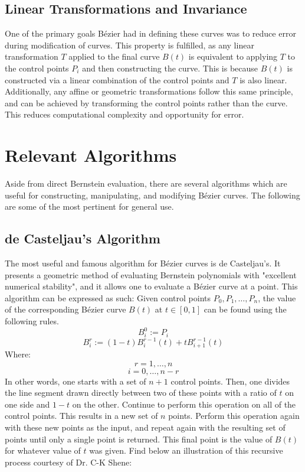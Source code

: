 \documentclass{article}
\begin{document}
\subsection{Linear Transformations and Invariance}
One of the primary goals Bézier had in defining these curves was to reduce error during modification of curves. This property is fulfilled, as any linear transformation $T$ applied to the final curve $B(t)$ is equivalent to applying $T$ to the control points $P_i$ and then constructing the curve. This is because $B(t)$ is constructed via a linear combination of the control points and $T$ is also linear.\cite{wyss-gallifent21} Additionally, any affine or geometric transformations follow this same principle, and can be achieved by transforming the control points rather than the curve.\cite{shene11} This reduces computational complexity and opportunity for error.

\pagebreak

\section{Relevant Algorithms}
Aside from direct Bernstein evaluation, there are several algorithms which are useful for constructing, manipulating, and modifying Bézier curves. The following are some of the most pertinent for general use.

\subsection{de Casteljau's Algorithm}
The most useful and famous algorithm for Bézier curves is de Casteljau's. It presents a geometric method of evaluating Bernstein polynomials with "excellent numerical stability"\cite{hanik-yazdani-tycoqicz24}, and it allows one to evaluate a Bézier curve at a point. This algorithm can be expressed as such:
Given control points $P_0, P_1, \dots, P_n$, the value of the corresponding Bézier curve $B(t)$ at $t\in[0,1]$ can be found using the following rules. $$B_i^0 := P_i$$$$B_i^r := (1-t)B_i^{r-1}(t)+tB_{i+1}^{r-1}(t)$$
Where:
$$r=1,\dots,n$$ $$i=0,\dots,n-r$$
\cite{hanik-yazdani-tycoqicz24}
In other words, one starts with a set of $n+1$ control points. Then, one divides the line segment drawn directly between two of these points with a ratio of $t$ on one side and $1-t$ on the other.\cite{shene11} Continue to perform this operation on all of the control points. This results in a new set of $n$ points. Perform this operation again with these new points as the input, and repeat again with the resulting set of points until only a single point is returned. This final point is the value of $B(t)$ for whatever value of $t$ was given. Find below an illustration of this recursive process courtesy of Dr. C-K Shene:
\end{document}
